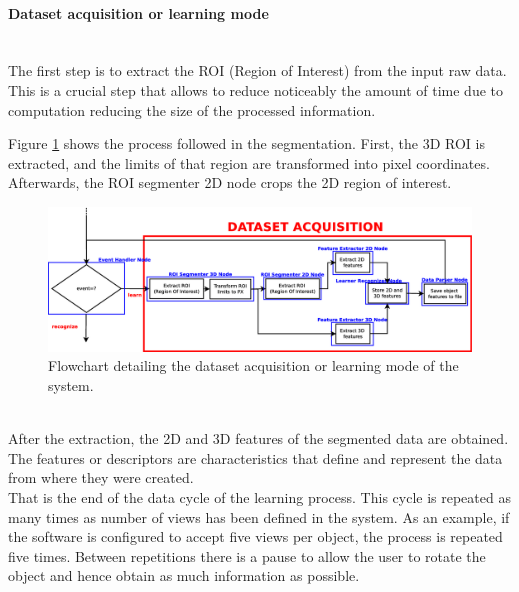 
\paragraph{Dataset acquisition or learning mode}\mbox{}
\\

The first step is to extract the ROI (Region of Interest) from the input raw data. 
This is a crucial step that allows to reduce noticeably the amount of time due to computation reducing the size of the processed information. 

Figure \ref{flowchart2} shows the process followed in the segmentation. 
First, the 3D ROI is extracted, and the limits of that region are transformed into pixel coordinates. 
Afterwards, the ROI segmenter 2D node crops the 2D region of interest. 
\begin{figure}[H]
	\begin{center}
\includegraphics[width=\linewidth]{img/diagrams/flowchart2.eps}
	\caption[Dataset acquisition flowchart]{Flowchart detailing the dataset acquisition or learning mode of the system.}
		\label{flowchart2}

	\end{center}
\end{figure}


\\

After the extraction, the 2D and 3D features of the segmented data are obtained. The features or descriptors are characteristics that define and represent the data from where they were created. 
\\
That is the end of the data cycle of the learning process. 
This cycle is repeated as many times as number of views has been defined in the system. 
As an example, if the software is configured to accept five views per object, the process is repeated five times. 
Between repetitions there is a pause to allow the user to rotate the object and hence obtain as much information as possible. 


